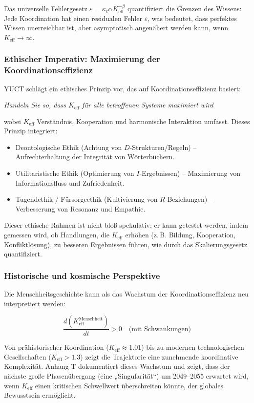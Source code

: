 \documentclass[12pt,a4paper]{article}
\newcommand{\eff}{\mathrm{eff}}
\newcommand{\Ke}{K_{\eff}}
\begin{document}
	Das universelle Fehlergesetz $\varepsilon = \kappa_c \alpha \Ke^{-\beta}$ quantifiziert die Grenzen des Wissens: Jede Koordination hat einen residualen Fehler $\varepsilon$, was bedeutet, dass perfektes Wissen unerreichbar ist, aber asymptotisch angenähert werden kann, wenn $\Ke \to \infty$.
	
	\subsubsection{Ethischer Imperativ: Maximierung der Koordinationseffizienz}
	
	YUCT schlägt ein ethisches Prinzip vor, das auf Koordinationseffizienz basiert:
	
	\begin{center}
		\textit{Handeln Sie so, dass $\Ke$ für alle betroffenen Systeme maximiert wird}
	\end{center}
	
	wobei $\Ke$ Verständnis, Kooperation und harmonische Interaktion umfasst. Dieses Prinzip integriert:
	\begin{itemize}
		\item Deontologische Ethik (Achtung von $D$-Strukturen/Regeln) – Aufrechterhaltung der Integrität von Wörterbüchern.
		\item Utilitaristische Ethik (Optimierung von $I$-Ergebnissen) – Maximierung von Informationsfluss und Zufriedenheit.
		\item Tugendethik / Fürsorgeethik (Kultivierung von $R$-Beziehungen) – Verbesserung von Resonanz und Empathie.
	\end{itemize}
	
	Dieser ethische Rahmen ist nicht bloß spekulativ; er kann getestet werden, indem gemessen wird, ob Handlungen, die $\Ke$ erhöhen (z. B. Bildung, Kooperation, Konfliktlösung), zu besseren Ergebnissen führen, wie durch das Skalierungsgesetz quantifiziert.
	
	\subsubsection{Historische und kosmische Perspektive}
	
	Die Menschheitsgeschichte kann als das Wachstum der Koordinationseffizienz neu interpretiert werden:
	
	\[
	\frac{d(\Ke^{\text{Menschheit}})}{dt} > 0 \quad \text{(mit Schwankungen)}
	\]
	
	Von prähistorischer Koordination ($\Ke \approx 1.01$) bis zu modernen technologischen Gesellschaften ($\Ke > 1.3$) zeigt die Trajektorie eine zunehmende koordinative Komplexität. Anhang T dokumentiert dieses Wachstum und zeigt, dass der nächste große Phasenübergang (eine „Singularität“) um 2049–2055 erwartet wird, wenn $\Ke$ einen kritischen Schwellwert überschreiten könnte, der globales Bewusstsein ermöglicht.
	
\end{document}
